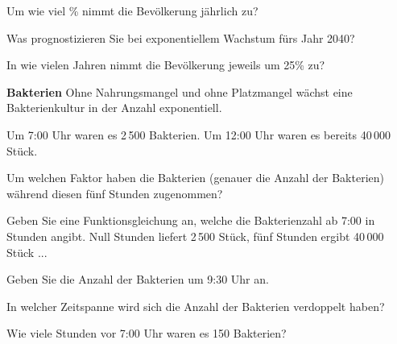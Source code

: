\begin{bbwAufgabenBlock}
\item Um wie viel \% nimmt die Bevölkerung jährlich zu?
\item Was prognostizieren Sie bei exponentiellem Wachstum fürs Jahr 2040?
\item In wie vielen Jahren nimmt die Bevölkerung jeweils um 25\% zu?
\end{bbwAufgabenBlock}
\platzFuerBerechnungenBisEndeSeite{}





\bbwActAufgabenNr{} \textbf{Bakterien}
 Ohne Nahrungsmangel und ohne Platzmangel wächst eine Bakterienkultur
 in der Anzahl exponentiell.

Um 7:00 Uhr waren es 2\,500 Bakterien.
Um 12:00 Uhr waren es bereits 40\,000 Stück.

\begin{bbwAufgabenBlock}

\item Um welchen Faktor haben die Bakterien (genauer die Anzahl der Bakterien) während diesen fünf
Stunden zugenommen?


\item Geben Sie eine Funktionsgleichung an, welche die Bakterienzahl ab
7:00 in Stunden angibt. Null Stunden liefert 2\,500 Stück, fünf
      Stunden ergibt 40\,000 Stück ...

\item Geben Sie die Anzahl der Bakterien um 9:30 Uhr an.

\item In welcher Zeitspanne wird sich die Anzahl der Bakterien
verdoppelt haben?

\item Wie viele Stunden vor 7:00 Uhr waren es 150 Bakterien?


\end{bbwAufgabenBlock}
\platzFuerBerechnungenBisEndeSeite{}

